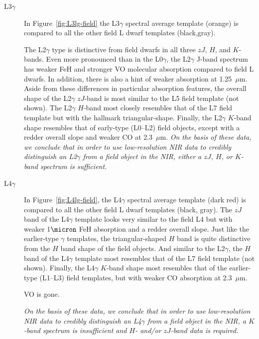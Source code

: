 \documentclass[12pt,preprint]{aastex}
\begin{document}
\begin{description}
\item[L3$\gamma$]{
In Figure~\ref{fig:L3lg-field} the L3$\gamma$ spectral average template (orange) is compared to all the other field L dwarf templates (black,gray). 

The L2$\gamma$ type is distinctive from field dwarfs in all three $zJ$, $H$, and $K$-bands. 
Even more pronounced than in the L0$\gamma$, the L2$\gamma$ J-band spectrum has weaker FeH and stronger VO molecular absorption compared to field L dwarfs. 
In addition, there is also a hint of weaker  absorption at 1.25~$\mu$m. Aside from these differences in particular absorption features, the overall shape of the L2$\gamma$ $zJ$-band is most similar to the L5 field template (not shown).
The L2$\gamma$ $H$-band most closely resembles that of the L7 field template but with the hallmark  triangular-shape. 
Finally, the L2$\gamma$ $K$-band shape resembles that of early-type (L0--L2) field objects, except with a redder overall slope and weaker CO at 2.3~$\mu$m. 
\emph{On the basis of these data, we conclude that in order to use low-resolution NIR data to credibly distinguish an L2$\gamma$ from a field object in the NIR, either a $zJ$, $H$, or $K$-band spectrum is sufficient.}
}

\item[L4$\gamma$]{
In Figure~\ref{fig:L4lg-field}, the L4$\gamma$ spectral average template (dark red) is compared to all the other field L dwarf templates (black, gray). 
The $zJ$ band of the L4$\gamma$ template looks very similar to the field L4 but with weaker 1$\micron$ FeH absorption and a redder overall slope. 
Just like the earlier-type $\gamma$ templates, the triangular-shaped $H$ band is quite distinctive from the $H$ band shape of the field objects. And similar to the L2$\gamma$, the $H$ band of the L4$\gamma$ template most resembles that of the L7 field template (not shown).
Finally, the L4$\gamma$ $K$-band shape most resembles that of the earlier-type (L1--L3) field templates, but with weaker CO absorption at 2.3~$\mu$m.

VO is gone.

\emph{On the basis of these data, we conclude that in order to use low-resolution NIR data to credibly distinguish an L4$\gamma$ from a field object in the NIR, a $K$-band spectrum is insufficient and $H$- and/or $zJ$-band data is required.}
}
\end{description}
\end{document}
